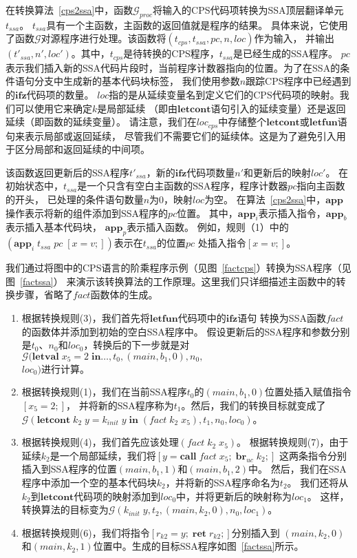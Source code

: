 在转换算法~\ref{cps2ssa}中，函数$\mathcal{G}_{proc}$将输入的CPS代码项转换为SSA顶层翻译单元$t_{ssa}$。
$t_{ssa}$具有一个主函数，主函数的返回值就是程序的结果。
具体来说，它使用了函数$\mathcal{G}$对源程序进行处理。该函数将$(t_{cps}, t_{ssa}, pc, n, loc)$作为输入，
并输出$(t'_{ssa}, n', loc')$。其中，$t_{cps}$是待转换的CPS程序，$t_{ssa}$是已经生成的SSA程序。
$pc$表示我们插入新的SSA代码片段时，当前程序计数器指向的位置。为了在SSA的条件语句分支中生成新的基本代码块标签，
我们使用参数$n$跟踪CPS程序中已经遇到的$\mathbf{ifz}$代码项的数量。
$loc$指的是从延续变量名到定义它们的CPS代码项的映射。我们可以使用它来确定$k$是局部延续
（即由$\mathbf{letcont}$语句引入的延续变量）还是返回延续（即函数的延续变量）。
请注意，我们在$loc_{cps}$中存储整个$\mathbf{letcont}$或$\mathbf{letfun}$语句来表示局部或返回延续，
尽管我们不需要它们的延续体。这是为了避免引入用于区分局部和返回延续的中间项。

该函数返回更新后的SSA程序$t'_{ssa}$，新的$\mathbf{ifz}$代码项数量$n'$和更新后的映射$loc'$。
在初始状态中，$t_{ssa}$是一个只含有空白主函数的SSA程序，程序计数器$pc$指向主函数的开头，
已处理的条件语句数量$n$为0，映射$loc$为空。
在算法~\ref{cps2ssa}中，$\mathbf{app}$操作表示将新的组件添加到SSA程序的$pc$位置。
其中，$\mathbf{app}_i$表示插入指令，$\mathbf{app}_b$表示插入基本代码块，
$\mathbf{app}_p$表示插入函数。
例如，规则（1）中的$(\mathbf{app}_i\; t_{ssa}\; pc\; [x=v;])$表示在$t_{ssa}$的位置$pc$
处插入指令$[x=v;]$。

我们通过将图中的CPS语言的阶乘程序示例（见图~\ref{factcps}）转换为SSA程序（见图~\ref{factssa}）
来演示该转换算法的工作原理。这里我们只详细描述主函数中的转换步骤，省略了$fact$函数体的生成。
\begin{enumerate}
    \item 根据转换规则(3)，我们首先将$\mathbf{letfun}$代码项中的$\mathbf{ifz}$语句
        转换为SSA函数$fact$的函数体并添加到初始的空白SSA程序中。
        假设更新后的SSA程序和参数分别是$t_0$、$n_0$和$loc_0$，转换后的下一步就是对
        $\mathcal{G}(\mathbf{letval}\; x_5=2\; \mathbf{in}\dots, t_0, (main,b_1,0), n_0,$ \\ $loc_0)$进行计算。   
    \item 根据转换规则(1)，我们在当前SSA程序$t_0$的$(main,b_1,0)$位置处插入赋值指令$[x_5=2;]$，
        并将新的SSA程序称为$t_1$。然后，我们的转换目标就变成了
        $\mathcal{G}(\mathbf{letcont}\; k_2\; y=k_{init}\; y\; \mathbf{in}\; (fact\; k_2\; x_5), t_1, n_0, loc_0)$。
    \item 根据转换规则(4)，我们首先应该处理$(fact\; k_2\; x_5)$。
        根据转换规则(7)，由于延续$k_2$是一个局部延续，我们将$[y = \mathbf{call}\; fact\; x_5;\; \mathbf{br}_{uc}\; k_2;]$
        这两条指令分别插入到SSA程序的位置$(main,b_1,1)$和$(main,b_1,2)$中。
        然后，我们在SSA程序中添加一个空的基本代码块$k_2$，并将新的SSA程序命名为$t_2$。
        我们还将从$k_2$到$\mathbf{letcont}$代码项的映射添加到$loc_0$中，并将更新后的映射称为$loc_1$。
        这样，转换算法的目标变为$\mathcal{G}(k_{init}\; y, t_2, (main,k_2,0), n_0, loc_1)$。
    \item 根据转换规则(6)，我们将指令$[r_{k2} = y;\; \mathbf{ret}\; r_{k2};]$分别插入到
        $(main,k_2,0)$和$(main,k_2,1)$位置中。生成的目标SSA程序如图~\ref{factssa}所示。
\end{enumerate}
